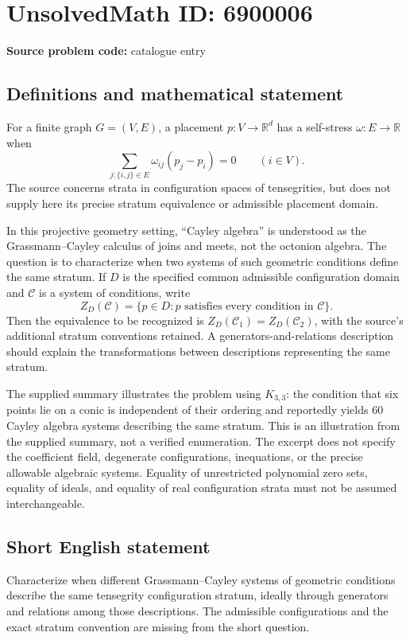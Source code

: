 \documentclass[11pt]{article}
\newcommand{\R}{\mathbb{R}}
\begin{document}
\section*{UnsolvedMath ID: 6900006}
\textbf{Source problem code:} catalogue entry
\subsection{Definitions and mathematical statement}
For a finite graph \(G=(V,E)\), a placement \(p:V\to\R^d\) has a self-stress \(\omega:E\to\R\) when
\[
 \sum_{j:\{i,j\}\in E}\omega_{ij}(p_j-p_i)=0\qquad(i\in V).
\]
The source concerns strata in configuration spaces of tensegrities, but does not supply here its precise stratum equivalence or admissible placement domain.

In this projective geometry setting, ``Cayley algebra'' is understood as the Grassmann--Cayley calculus of joins and meets, not the octonion algebra. The question is to characterize when two systems of such geometric conditions define the same stratum. If \(D\) is the specified common admissible configuration domain and \(\mathcal C\) is a system of conditions, write
\[
 Z_D(\mathcal C)=\{p\in D:p\text{ satisfies every condition in }\mathcal C\}.
\]
Then the equivalence to be recognized is \(Z_D(\mathcal C_1)=Z_D(\mathcal C_2)\), with the source's additional stratum conventions retained. A generators-and-relations description should explain the transformations between descriptions representing the same stratum.

The supplied summary illustrates the problem using \(K_{3,3}\): the condition that six points lie on a conic is independent of their ordering and reportedly yields 60 Cayley algebra systems describing the same stratum. This is an illustration from the supplied summary, not a verified enumeration. The excerpt does not specify the coefficient field, degenerate configurations, inequations, or the precise allowable algebraic systems. Equality of unrestricted polynomial zero sets, equality of ideals, and equality of real configuration strata must not be assumed interchangeable.
\subsection{Short English statement}
Characterize when different Grassmann--Cayley systems of geometric conditions describe the same tensegrity configuration stratum, ideally through generators and relations among those descriptions. The admissible configurations and the exact stratum convention are missing from the short question.
\end{document}
